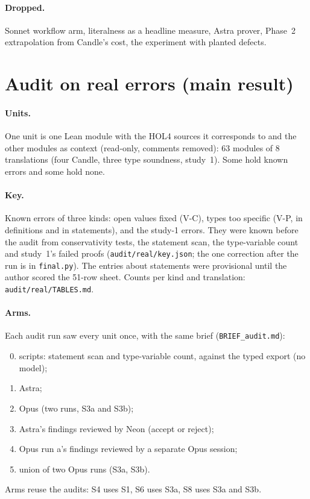 \documentclass[11pt,a4paper]{article}
\newcommand{\code}[1]{\texttt{#1}}
\begin{document}
\paragraph{Dropped.} Sonnet workflow arm, literalness as a headline measure, Astra prover, Phase~2 extrapolation from Candle's cost, the experiment with planted defects.

\section{Audit on real errors (main result)}\label{sec:audit}
\paragraph{Units.} One unit is one Lean module with the HOL4 sources it corresponds to and the other modules as context (read-only, comments removed): 63 modules of 8 translations (four Candle, three type soundness, study~1). Some hold known errors and some hold none.
\paragraph{Key.} Known errors of three kinds: open values fixed (V-C), types too specific (V-P, in definitions and in statements), and the study-1 errors. They were known before the audit from conservativity tests, the statement scan, the type-variable count and study~1's failed proofs (\code{audit/real/key.json}; the one correction after the run is in \code{final.py}). The entries about statements were provisional until the author scored the 51-row sheet. Counts per kind and translation: \code{audit/real/TABLES.md}.
\paragraph{Arms.} Each audit run saw every unit once, with the same brief (\code{BRIEF\_audit.md}):
\begin{enumerate}[label=S\arabic*.]\setcounter{enumi}{-1}
\item scripts: statement scan and type-variable count, against the typed export (no model);
\item Astra;
\setcounter{enumi}{2}
\item Opus (two runs, S3a and S3b);
\item Astra's findings reviewed by Neon (accept or reject);
\setcounter{enumi}{5}
\item Opus run a's findings reviewed by a separate Opus session;
\setcounter{enumi}{7}
\item union of two Opus runs (S3a, S3b).
\end{enumerate}
Arms reuse the audits: S4 uses S1, S6 uses S3a, S8 uses S3a and S3b.
\end{document}
